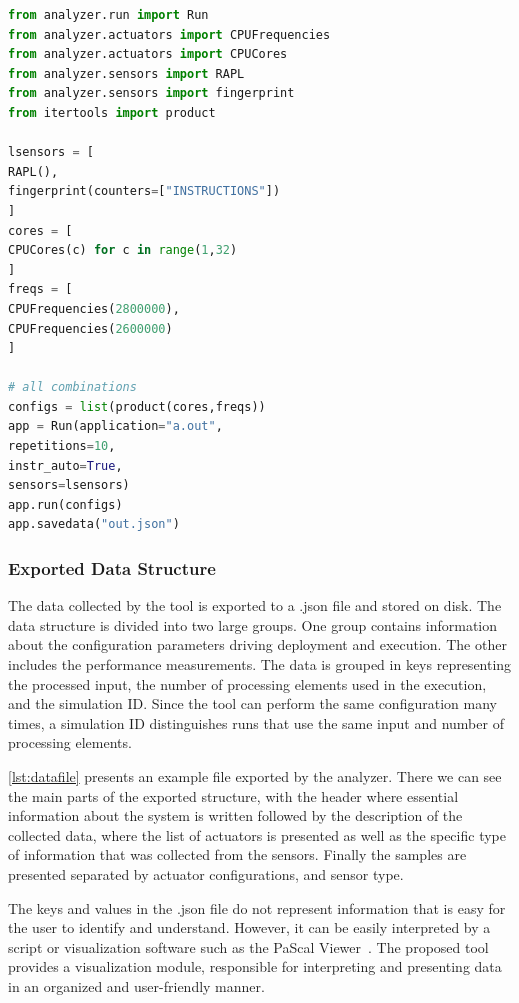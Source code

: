 \lstset{style=pythonStyle,frame=tb}
\begin{lstlisting}[label={lst:pascal_api}, language=python, caption={Python script showing some API features provided by the tool, on how a custom run can be configured.}, captionpos=b]
from analyzer.run import Run
from analyzer.actuators import CPUFrequencies
from analyzer.actuators import CPUCores
from analyzer.sensors import RAPL
from analyzer.sensors import fingerprint
from itertools import product

lsensors = [
RAPL(), 
fingerprint(counters=["INSTRUCTIONS"])
]
cores = [
CPUCores(c) for c in range(1,32)
]
freqs = [
CPUFrequencies(2800000), 
CPUFrequencies(2600000)
]

# all combinations
configs = list(product(cores,freqs))
app = Run(application="a.out",
repetitions=10, 
instr_auto=True, 
sensors=lsensors)
app.run(configs)
app.savedata("out.json")
\end{lstlisting}



\subsubsection{Exported Data Structure} \label{subsec:datastructure_pascal}

The data collected by the tool is exported to a .json file and stored on disk. The data structure is divided into two large groups. One group contains information about the configuration parameters driving deployment and execution. The other includes the performance measurements. The data is grouped in keys representing the processed input, the number of processing elements used in the execution, and the simulation ID. Since the tool can perform the same configuration many times, a simulation ID distinguishes runs that use the same input and number of processing elements.


\cref{lst:datafile} presents an example file exported by the analyzer. There we can see the main parts of the exported structure, with the header where essential information about the system is written followed by the description of the collected data, where the list of actuators is presented as well as the specific type of information that was collected from the sensors. Finally the samples are presented separated by actuator configurations, and sensor type.

The keys and values in the .json file do not represent information that is easy for the user to identify and understand. However, it can be easily interpreted by a script or visualization software such as the PaScal Viewer~\cite{Silva2018}. The proposed tool provides a visualization module, responsible for interpreting and presenting data in an organized and user-friendly manner.

